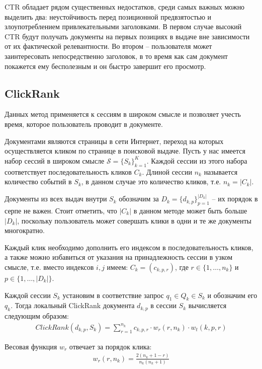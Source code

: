 \documentclass[diploma]{nanolab2015}
\begin{document}
CTR обладает рядом существенных недостатков, среди самых важных можно выделить два: неустойчивость перед позиционной предвзятостью и злоупотреблением привлекательными заголовками. В первом случае высокий CTR будут получать документы на первых позициях в выдаче вне зависимости от их фактической релевантности. Во втором -- пользователя может заинтересовать непосредственно заголовок, в то время как сам документ покажется ему бесполезным и он быстро завершит его просмотр.

\subsection{ClickRank}
Данных метод применяется к сессиям в широком смысле и позволяет учесть время, которое пользователь проводит в документе.

Документами являются страницы в сети Интернет, переход на которых осуществляется кликом по странице в поисковой выдаче.
Пусть у нас имеется набор сессий в широком смысле $\mathcal{S} = \{S_k\}_{k=1}^K$. Каждой сессии из этого набора соответствует последовательность кликов $C_k$. Длиной сессии $n_k$ называется количество событий в $S_k$, в данном случае это количество кликов, т.е. $n_k = |C_k|$.

Документы из всех выдач внутри $S_k$ обозначим за $D_k = \{d_{k,p}\}_{p=1}^{|D_k|}$ -- их порядок в серпе не важен.
Стоит отметить, что $|C_k|$ в данном методе может быть больше $|D_k|$, поскольку пользователь может совершать клики в одни и те же документы многократно.

Каждый клик необходимо дополнить его индексом в последовательность кликов, а также можно избавиться от указания на принадлежность сессии в узком смысле, т.е. вместо индексов $i,j$ имеем: $C_k = (c_{k,p,r})$, где $r \in \{1, \dots, n_k\}$ и $p \in \{1, \dots, |D_k|\}$.

Каждой сессии $S_k$ установим в соответствие запрос $q_1 \in Q_k \in S_k$ и обозначим его $q_k$. Тогда локальный ClickRank \cite{clickrank} документа $d_{k,p}$ в сессии $S_k$ вычисляется следующим образом:
\begin{align}
    ClickRank(d_{k,p}, S_k) = \sum_{r=1}^{n_k} c_{k, p, r} \cdot w_r(r, n_k) \cdot w_t(k,p,r)
\end{align}

Весовая функция $w_r$ отвечает за порядок клика:
\begin{align}
    w_r(r, n_k) = \frac{2(n_k + 1 - r)}{n_k(n_k + 1)}
\end{align}
\end{document}

